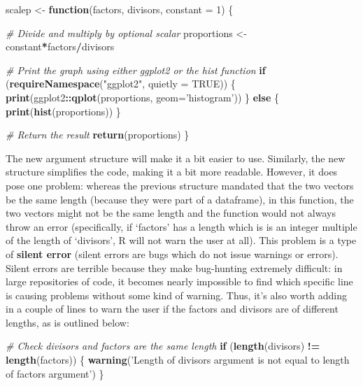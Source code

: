 \documentclass[]{book}
\newenvironment{Shaded}{\begin{snugshade}}{\end{snugshade}}
\newcommand{\KeywordTok}[1]{\textcolor[rgb]{0.13,0.29,0.53}{\textbf{#1}}}
\newcommand{\DataTypeTok}[1]{\textcolor[rgb]{0.13,0.29,0.53}{#1}}
\newcommand{\DecValTok}[1]{\textcolor[rgb]{0.00,0.00,0.81}{#1}}
\newcommand{\StringTok}[1]{\textcolor[rgb]{0.31,0.60,0.02}{#1}}
\newcommand{\CommentTok}[1]{\textcolor[rgb]{0.56,0.35,0.01}{\textit{#1}}}
\newcommand{\OtherTok}[1]{\textcolor[rgb]{0.56,0.35,0.01}{#1}}
\newcommand{\ControlFlowTok}[1]{\textcolor[rgb]{0.13,0.29,0.53}{\textbf{#1}}}
\newcommand{\OperatorTok}[1]{\textcolor[rgb]{0.81,0.36,0.00}{\textbf{#1}}}
\newcommand{\NormalTok}[1]{#1}
\begin{document}
\begin{Shaded}
\begin{Highlighting}[]
\NormalTok{scalep <-}\StringTok{ }\ControlFlowTok{function}\NormalTok{(factors, divisors, }\DataTypeTok{constant =} \DecValTok{1}\NormalTok{) \{}

  \CommentTok{# Divide and multiply by optional scalar}
\NormalTok{  proportions <-}\StringTok{ }\NormalTok{constant}\OperatorTok{*}\NormalTok{factors}\OperatorTok{/}\NormalTok{divisors}

  \CommentTok{# Print the graph using either ggplot2 or the hist function}
  \ControlFlowTok{if}\NormalTok{ (}\KeywordTok{requireNamespace}\NormalTok{(}\StringTok{"ggplot2"}\NormalTok{, }\DataTypeTok{quietly =} \OtherTok{TRUE}\NormalTok{)) \{}
    \KeywordTok{print}\NormalTok{(ggplot2}\OperatorTok{::}\KeywordTok{qplot}\NormalTok{(proportions, }\DataTypeTok{geom=}\StringTok{'histogram'}\NormalTok{))}
\NormalTok{  \} }\ControlFlowTok{else}\NormalTok{ \{}
    \KeywordTok{print}\NormalTok{(}\KeywordTok{hist}\NormalTok{(proportions))}
\NormalTok{  \}}

  \CommentTok{# Return the result}
  \KeywordTok{return}\NormalTok{(proportions)}
\NormalTok{\}}
\end{Highlighting}
\end{Shaded}

The new argument structure will make it a bit easier to use. Similarly,
the new structure simplifies the code, making it a bit more readable.
However, it does pose one problem: whereas the previous structure
mandated that the two vectors be the same length (because they were part
of a dataframe), in this function, the two vectors might not be the same
length and the function would not always throw an error (specifically,
if `factors' has a length which is is an integer multiple of the length
of `divisors', R will not warn the user at all). This problem is a type
of \textbf{silent error} (silent errors are bugs which do not issue
warnings or errors). Silent errors are terrible because they make
bug-hunting extremely difficult: in large repositories of code, it
becomes nearly impossible to find which specific line is causing
problems without some kind of warning. Thus, it's also worth adding in a
couple of lines to warn the user if the factors and divisors are of
different lengths, as is outlined below:

\begin{Shaded}
\begin{Highlighting}[]
  \CommentTok{# Check divisors and factors are the same length}
  \ControlFlowTok{if}\NormalTok{ (}\KeywordTok{length}\NormalTok{(divisors) }\OperatorTok{!=}\StringTok{ }\KeywordTok{length}\NormalTok{(factors)) \{}
    \KeywordTok{warning}\NormalTok{(}\StringTok{'Length of divisors argument is not equal to length of factors argument'}\NormalTok{)}
\NormalTok{  \}}
\end{Highlighting}
\end{Shaded}
\end{document}
